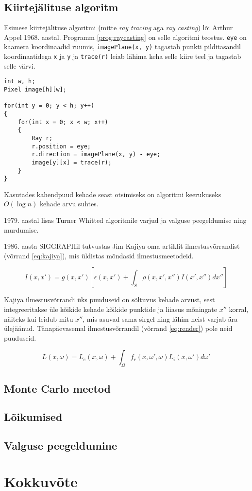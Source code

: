 \documentclass[a4paper,12pt]{report}
\begin{document}
\section{Kiirtejälituse algoritm}
Esimese kiirtejälituse algoritmi (mitte \textit{ray tracing} aga
\textit{ray casting}) lõi Arthur Appel 1968. aastal. Programm
\ref{prog:raycasting} on selle algoritmi teostus. \texttt{eye} on
kaamera koordinaadid ruumis, \texttt{imagePlane(x, y)} tagastab punkti
pilditasandil koordinaatidega \texttt{x} ja \texttt{y} ja
\texttt{trace(r)} leiab lähima keha selle kiire teel ja tagastab selle
värvi.

\begin{lstlisting}[caption=\textit{Ray casting}, label=prog:raycasting]
int w, h;
Pixel image[h][w];

for(int y = 0; y < h; y++)
{
	for(int x = 0; x < w; x++)
	{
		Ray r;
		r.position = eye;
		r.direction = imagePlane(x, y) - eye;
		image[y][x] = trace(r);
	}
}
\end{lstlisting}

Kasutades kahendpuud kehade seast otsimiseks on algoritmi keerukuseks
\(O(\log n)\) kehade arvu suhtes.

1979. aastal lisas Turner Whitted algoritmile varjud ja valguse
peegeldumise ning murdumise.

1986. aasta SIGGRAPHil tutvustas Jim Kajiya oma artiklit
ilmestusvõrrandist (võrrand \ref{eq:kajiya}), mis üldistas mõndasid
ilmestusmeetodeid. \cite{kajiya86}

\begin{equation} \label{eq:kajiya}
I(x, x') = g(x, x')\left[\epsilon(x, x') +\int_S \rho(x, x', x'')I(x', x'') dx'' \right]
\end{equation}

Kajiya ilmestusvõrrandi üks puuduseid on sõltuvus kehade arvust, sest
integreeritakse üle kõikide kehade kõikide punktide ja liiasus mõningate
\(x''\) korral, näiteks kui leidub mitu \(x''\), mis asuvad sama sirgel
ning lähim neist varjab ära ülejäänud. Tänapäevasemal ilmestusvõrrandil
(võrrand \ref{eq:render}) pole neid puuduseid.

\begin{equation} \label{eq:render}
L(x, \omega) = L_e(x, \omega) + \int_\Omega f_r(x, \omega', \omega) L_i(x, \omega') d\omega'
\end{equation}

\section{Monte Carlo meetod}
\section{Lõikumised}
\section{Valguse peegeldumine}

\chapter*{Kokkuvõte}

\renewcommand\bibname{Kasutatud materjalid}


\end{document}
